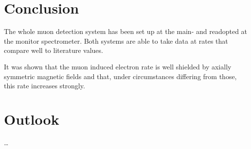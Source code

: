 
\chapter{Conclusion}
\label{ch:Conclusion}

The whole muon detection system has been set up at the main- and readopted at the monitor spectrometer. Both systems are able to take data at rates that compare well to literature values. 

It was shown that the muon induced electron rate is well shielded by axially symmetric magnetic fields and that, under circumstances differing from those, this rate increases strongly. 

\chapter{Outlook}
\label{ch:Outlook}

\dots
